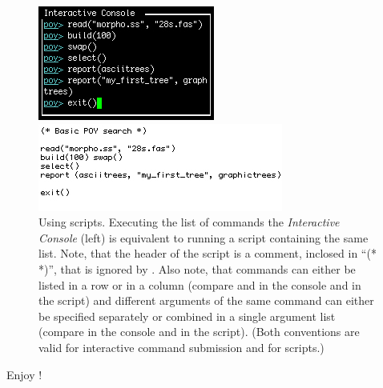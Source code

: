 \begin{figure}
\centering
\begin{minipage}[c]{0.42\textwidth}
   		\includegraphics[width=\textwidth]{figures/commandlist.jpg}
\end{minipage}
\quad
\begin{minipage}[c]{0.53\textwidth}
	   	\includegraphics[width=\textwidth]{figures/script.jpg}
   	\end{minipage}
\caption{Using \poy scripts. Executing the list of commands the \emph{Interactive Console} (left)  is equivalent to running a script containing the same list. Note, that the header of the script is a comment, inclosed in ``(* *)'', that is ignored by \poy. Also note, that commands can either be listed in a row or in a column (compare  and  in the console and in the script) and different arguments of the same command can either be specified separately or combined in a single argument list (compare  in the console and in the script). (Both conventions are valid for interactive command submission and for scripts.)}
\label{fig:script}
\end{figure}

\begin{center}
Enjoy \poy!
\end{center}



